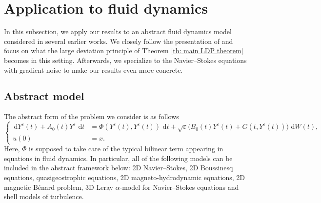 \documentclass{amsart}
\newcommand{\dd}{\,\mathrm{d}}
\newcommand{\<}{\langle}
\newcommand{\?}{\rangle}
\theoremstyle{plain}
\theoremstyle{remark}
\theoremstyle{plain}
\numberwithin{equation}{section}
\begin{document}
\section{Application to fluid dynamics}\label{ss:fluid}
In this subsection, we apply our results to an abstract fluid dynamics model considered in several earlier works. We closely follow the presentation of \cite{AVsurvey,chueshovmillet10} and focus on what the large deviation principle of Theorem \ref{th: main LDP theorem} becomes in this setting. Afterwards, we specialize to the Navier--Stokes equations with gradient noise to make our results even more concrete.  

\subsection{Abstract model}
The abstract form of the problem we consider is as follows
\begin{equation}\label{eq:abstractfluid}
\left\{
\begin{aligned}
\dd Y^{\varepsilon}(t) + A_0(t) Y^{\varepsilon} \,\dd t &= \Phi(Y^{\varepsilon}(t), Y^{\varepsilon}(t)) \,\dd t + \sqrt{\varepsilon} \big(B_0(t) Y^{\varepsilon}(t) + G(t,Y^{\varepsilon}(t))\big) \,\dd W(t), 
\\ u(0) &= x.
\end{aligned}\right.
\end{equation}
Here, $\Phi$ is supposed to take care of the typical bilinear term appearing in equations in fluid dynamics. In particular, all of the following models can be included in the abstract framework below: 2D Navier--Stokes, 2D Boussinesq equations, quasigeostrophic equations, 2D magneto-hydrodynamic equations, 2D magnetic B\'enard problem, 3D Leray $\alpha$-model for Navier--Stokes equations and shell models of turbulence. 
\end{document}
